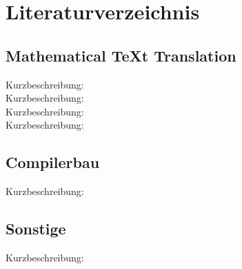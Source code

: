 \documentclass{article}
\begin{document}

\chapter{Literaturverzeichnis}
\section{Mathematical TeXt Translation}
Kurzbeschreibung:	\cite{Machine_Translation_of_Mathematical_Text_Ohri_2020} \\
Kurzbeschreibung:	\cite{Neural_Machine_Translation_for_Mathematical_Formulae_Petersen_2023} \\
Kurzbeschreibung:	\cite{Rule_Based_Conversion_of_LaTeX_Math_Equations_into_Content_MathML_Hussain_2020} \\
Kurzbeschreibung:	\cite{MathML-aware_article_conversion_from_LATEX_A_comparison_study_Stramerjohanns_2009} \\

\section{Compilerbau}
Kurzbeschreibung:	\cite{dragonbook_compiler} \\

\section{Sonstige}
Kurzbeschreibung:	\cite{Soziale_Kompetenzen_fuer_Informatiker_Schumacher_2013} \\

\printbibliography

\end{document}
